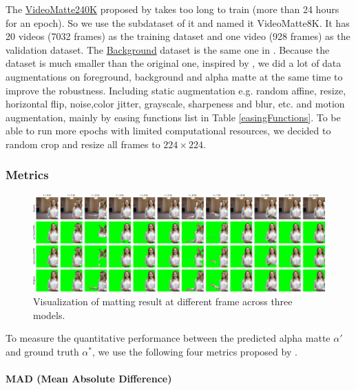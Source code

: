 \documentclass[final]{cvpr}
\begin{document}
The \href{https://grail.cs.washington.edu/projects/background-matting-v2/#/datasets}{VideoMatte240K} proposed by \cite{linRealTimeHighResolutionBackground2020a} takes too long to train (more than 24 hours for an epoch).
So we use the subdataset of it and named it VideoMatte8K.
It has 20 videos (7032 frames) as the training dataset and one video (928 frames) as the validation dataset.
The \href{https://grail.cs.washington.edu/projects/background-matting-v2/#/datasets}{Background} dataset is the same one in \cite{linRealTimeHighResolutionBackground2020a}. Because the dataset is much smaller than the original one, inspired by \cite{linRobustHighResolutionVideo2021}, we did a lot of data augmentations on foreground, background and alpha matte at the same time to improve the robustness.
Including static augmentation e.g. random affine, resize, horizontal flip, noise,color jitter, grayscale, sharpeness and blur, etc. and motion augmentation, mainly by easing functions list in Table \ref{easingFunctions}.
To be able to run more epochs with limited computational resources, we decided to random crop and resize all frames to $224 \times 224$.

\subsubsection{Metrics}

\begin{figure}[htb]
    \begin{center}
        \includegraphics[width=1\textwidth]{img/visual.pdf}
    \end{center}
    \caption{Visualization of matting result at different frame across three models.}
    \label{visual}
\end{figure}

To measure the quantitative performance between the predicted alpha matte $\alpha'$ and ground truth $\alpha^*$, we use the following four metrics proposed by \cite{Rhemann2009APM}.

\paragraph{MAD (Mean Absolute Difference)}
\end{document}
